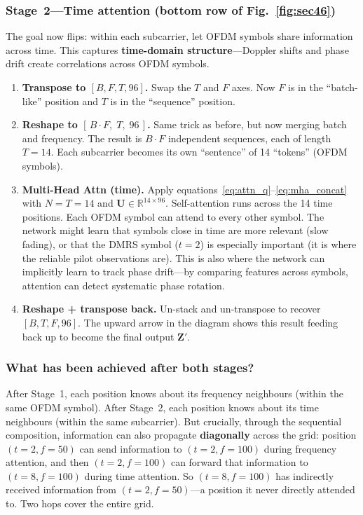\documentclass[11pt,a4paper]{article}
\begin{document}
	\subsubsection*{Stage~2---Time attention (bottom row of Fig.~\ref{fig:sec46})}
	
	The goal now flips: within each subcarrier, let OFDM symbols share information across time.  This captures \textbf{time-domain structure}---Doppler shifts and phase drift create correlations across OFDM symbols.
	
	\begin{enumerate}[nosep]
		\item \textbf{Transpose to $[B, F, T, 96]$.}  Swap the $T$ and $F$ axes.  Now $F$ is in the ``batch-like'' position and $T$ is in the ``sequence'' position.
		
		\item \textbf{Reshape to $[\,B \!\cdot\! F,\; T,\; 96\,]$.}  Same trick as before, but now merging batch and frequency.  The result is $B \!\cdot\! F$ independent sequences, each of length $T\!=\!14$.  Each subcarrier becomes its own ``sentence'' of 14 ``tokens'' (OFDM symbols).
		
		\item \textbf{Multi-Head Attn (time).}  Apply equations~\eqref{eq:attn_q}--\eqref{eq:mha_concat} with $N\!=\!T\!=\!14$ and $\mathbf{U} \in \mathbb{R}^{14 \times 96}$.  Self-attention runs across the 14 time positions.  Each OFDM symbol can attend to every other symbol.  The network might learn that symbols close in time are more relevant (slow fading), or that the DMRS symbol ($t\!=\!2$) is especially important (it is where the reliable pilot observations are).  This is also where the network can implicitly learn to track phase drift---by comparing features across symbols, attention can detect systematic phase rotation.
		
		\item \textbf{Reshape + transpose back.}  Un-stack and un-transpose to recover $[B, T, F, 96]$.  The upward arrow in the diagram shows this result feeding back up to become the final output $\mathbf{Z}'$.
	\end{enumerate}
	
	\subsubsection*{What has been achieved after both stages?}
	
	After Stage~1, each position knows about its frequency neighbours (within the same OFDM symbol).  After Stage~2, each position knows about its time neighbours (within the same subcarrier).  But crucially, through the sequential composition, information can also propagate \textbf{diagonally} across the grid: position $(t\!=\!2, f\!=\!50)$ can send information to $(t\!=\!2, f\!=\!100)$ during frequency attention, and then $(t\!=\!2, f\!=\!100)$ can forward that information to $(t\!=\!8, f\!=\!100)$ during time attention.  So $(t\!=\!8, f\!=\!100)$ has indirectly received information from $(t\!=\!2, f\!=\!50)$---a position it never directly attended to.  Two hops cover the entire grid.
	
\end{document}
